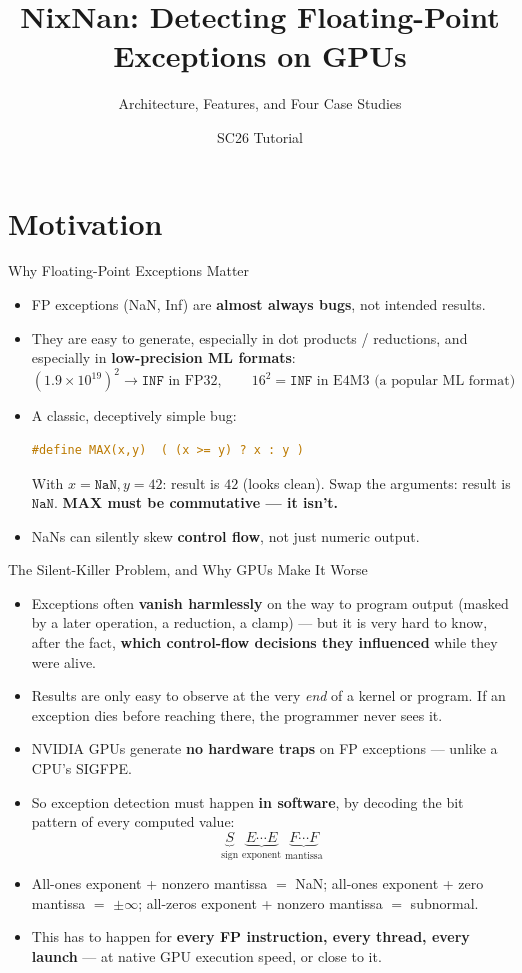 \documentclass[aspectratio=169,11pt]{beamer}
\title{NixNan: Detecting Floating-Point Exceptions on GPUs}
\subtitle{Architecture, Features, and Four Case Studies}
\author{SC26 Tutorial}
\date{}
\begin{document}
\begin{frame}
\titlepage
\end{frame}

\section{Motivation}

\begin{frame}[fragile]{Why Floating-Point Exceptions Matter}
\begin{itemize}
  \item FP exceptions (NaN, Inf) are \textbf{almost always bugs}, not intended results.
  \item They are easy to generate, especially in dot products / reductions, and
    especially in \textbf{low-precision ML formats}:
  \[
  (1.9\times10^{19})^2 \to \mathtt{INF} \text{ in FP32}, \qquad
  16^2 = \mathtt{INF} \text{ in E4M3 (a popular ML format)}
  \]
  \item A classic, deceptively simple bug:
\begin{lstlisting}[language=C]
#define MAX(x,y)  ( (x >= y) ? x : y )
\end{lstlisting}
  With $x=\mathtt{NaN}, y=42$: result is $42$ (looks clean). Swap the
  arguments: result is $\mathtt{NaN}$. \textbf{MAX must be commutative --- it isn't.}
  \item NaNs can silently skew \textbf{control flow}, not just numeric output.
\end{itemize}
\end{frame}

\begin{frame}{The Silent-Killer Problem, and Why GPUs Make It Worse}
\begin{itemize}
  \item Exceptions often \textbf{vanish harmlessly} on the way to program output
    (masked by a later operation, a reduction, a clamp) --- but it is very
    hard to know, after the fact, \textbf{which control-flow decisions they
    influenced} while they were alive.
  \item Results are only easy to observe at the very \emph{end} of a kernel
    or program. If an exception dies before reaching there, the programmer
    never sees it.
  \item NVIDIA GPUs generate \textbf{no hardware traps} on FP exceptions ---
    unlike a CPU's SIGFPE.
  \item So exception detection must happen \textbf{in software}, by decoding
    the bit pattern of every computed value:
  \[
  \underbrace{S}_{\text{sign}}\;\underbrace{E\cdots E}_{\text{exponent}}\;\underbrace{F\cdots F}_{\text{mantissa}}
  \]
  \item All-ones exponent + nonzero mantissa $=$ NaN; all-ones exponent + zero
    mantissa $=$ $\pm\infty$; all-zeros exponent + nonzero mantissa $=$ subnormal.
  \item This has to happen for \textbf{every FP instruction, every thread,
    every launch} --- at native GPU execution speed, or close to it.
\end{itemize}
\end{frame}
\end{document}
